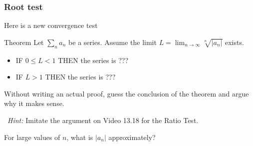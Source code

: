 \documentclass[14pt]{beamer}
\newcommand{\setsize}[1]{\fontsize{#1}{#1}\selectfont} %
\newcommand{\smallerfont}{\setsize{13}} %
\begin{document}
	\begin{frame}[t]
		\smallerfont
		\frametitle{Root test}

		Here is a new convergence test
		\begin{block}{Theorem}
			Let ${\displaystyle \sum_{n} a_n}$ be a series. Assume the limit
			${\displaystyle L= \lim_{n \to \infty} \sqrt[n]{|a_{n}|}}$ exists.
			\begin{itemize}
				\item IF $0 \leq L <1$ THEN the series is ???

				\item IF $L > 1$ THEN the series is ???
			\end{itemize}
		\end{block}

		Without writing an actual proof, guess the conclusion of the theorem and
		argue why it makes sense.

		\
 \emph{Hint:} Imitate the argument on Video 13.18 for the Ratio Test.

		For large values of $n$, what is $|a_{n}|$ approximately?
	\end{frame}
\end{document}
